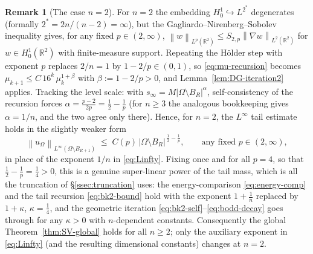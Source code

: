 \documentclass[11pt]{amsart}
\theoremstyle{definition}
\newtheorem{remark}[theorem]{Remark}
\newcommand{\R}{\mathbb R}
\newcommand{\Om}{\Omega}
\newcommand{\abs}[1]{\left|#1\right|}
\newcommand{\norm}[1]{\left\|#1\right\|}
\begin{document}
\begin{remark}[The case $n=2$]\label{rem:n2}
For $n=2$ the embedding $H^1_0\hookrightarrow L^{2^*}$ degenerates
(formally $2^*=2n/(n-2)=\infty$), but the
Gagliardo--Nirenberg--Sobolev inequality gives, for any fixed
$p\in(2,\infty)$,
$\norm{w}_{L^{p}(\R^2)}\le S_{2,p}\norm{\nabla w}_{L^2(\R^2)}$ for
$w\in H^1_0(\R^2)$ with finite-measure support. Repeating the Hölder step
with exponent $p$ replaces $2/n=1$ by $1-2/p\in(0,1)$, so
\eqref{eq:mu-recursion} becomes
$\mu_{k+1}\le C\,16^k\,\mu_k^{1+\beta}$ with $\beta:=1-2/p>0$, and
Lemma~\ref{lem:DG-iteration2} applies. Tracking the level scale: with
$s_\infty=M\abs{\Om\setminus B_R}^{\alpha}$, self-consistency of the
recursion forces $\alpha=\tfrac{p-2}{2p}=\tfrac12-\tfrac1p$ (for $n\ge3$
the analogous bookkeeping gives $\alpha=1/n$, and the two agree only there).
Hence, for $n=2$, the $L^\infty$ tail estimate holds in the slightly weaker
form
\[
   \norm{u_\Om}_{L^\infty(\Om\setminus B_{R+1})}
   \;\le\;C(p)\,\abs{\Om\setminus B_R}^{\,\frac12-\frac1p},
   \qquad\text{any fixed }p\in(2,\infty),
\]
in place of the exponent $1/n$ in \eqref{eq:Linfty}. Fixing once and for
all $p=4$, so that $\tfrac12-\tfrac1p=\tfrac14>0$, this is a genuine
super-linear power of the tail mass, which is all the truncation of
\S\ref{ssec:truncation} uses: the energy-comparison
\eqref{eq:energy-comp} and the tail recursion \eqref{eq:bk2-bound} hold
with the exponent $1+\tfrac1n$ replaced by $1+\kappa$, $\kappa=\tfrac14$,
and the geometric iteration \eqref{eq:bk2-self}--\eqref{eq:bodd-decay} goes
through for any $\kappa>0$ with $n$-dependent constants. Consequently the
global Theorem~\ref{thm:SV-global} holds for all $n\ge2$; only the
auxiliary exponent in \eqref{eq:Linfty} (and the resulting dimensional
constants) changes at $n=2$.
\end{remark}
\end{document}
